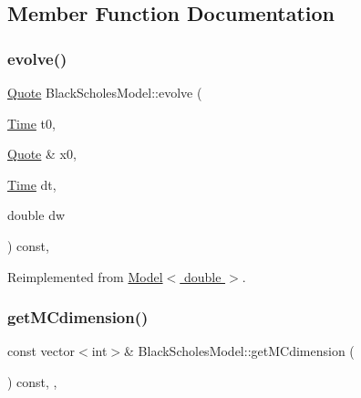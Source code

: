 \subsection{Member Function Documentation}
\hypertarget{class_black_scholes_model_a67c3ed604a6d057112ec7e7a1a3fb301}{}\label{class_black_scholes_model_a67c3ed604a6d057112ec7e7a1a3fb301} 
\subsubsection{\texorpdfstring{evolve()}{evolve()}}
{\footnotesize\ttfamily \hyperlink{_name_def_8h_a642a6c5fd87319d922637de0e0bb0305}{Quote} Black\+Scholes\+Model\+::evolve (\begin{DoxyParamCaption}\item[{\hyperlink{_name_def_8h_ac2d3e0ba793497bcca555c7c2cf64ff3}{Time}}]{t0,  }\item[{\hyperlink{_name_def_8h_a642a6c5fd87319d922637de0e0bb0305}{Quote} \&}]{x0,  }\item[{\hyperlink{_name_def_8h_ac2d3e0ba793497bcca555c7c2cf64ff3}{Time}}]{dt,  }\item[{double}]{dw }\end{DoxyParamCaption}) const\hspace{0.3cm}{\ttfamily [override]}, {\ttfamily [virtual]}}



Reimplemented from \hyperlink{class_model_a18b1fe1476b5adde8d6125e7f6a7f932}{Model$<$ double $>$}.

\hypertarget{class_black_scholes_model_a5665e6ea247e4f243082f5c98bbdbad6}{}\label{class_black_scholes_model_a5665e6ea247e4f243082f5c98bbdbad6} 
\subsubsection{\texorpdfstring{get\+M\+Cdimension()}{getMCdimension()}}
{\footnotesize\ttfamily const vector$<$int$>$\& Black\+Scholes\+Model\+::get\+M\+Cdimension (\begin{DoxyParamCaption}{ }\end{DoxyParamCaption}) const\hspace{0.3cm}{\ttfamily [inline]}, {\ttfamily [override]}, {\ttfamily [virtual]}}



